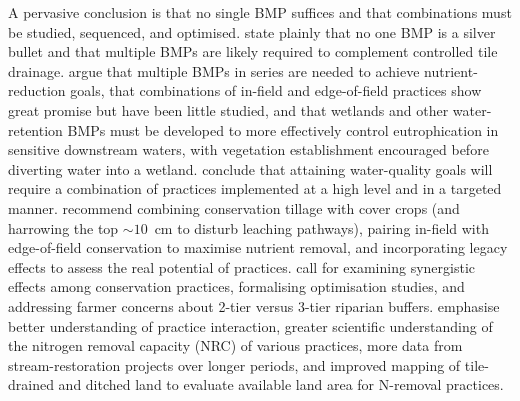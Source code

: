 \documentclass[11pt]{article}
\begin{document}
A pervasive conclusion is that no single BMP suffices and that combinations must be studied, sequenced, and optimised. \textcite{Sunohara2016} state plainly that no one BMP is a silver bullet and that multiple BMPs are likely required to complement controlled tile drainage. \textcite{Lenhart2016} argue that multiple BMPs in series are needed to achieve nutrient-reduction goals, that combinations of in-field and edge-of-field practices show great promise but have been little studied, and that wetlands and other water-retention BMPs must be developed to more effectively control eutrophication in sensitive downstream waters, with vegetation establishment encouraged before diverting water into a wetland. \textcite{Christianson2014} conclude that attaining water-quality goals will require a combination of practices implemented at a high level and in a targeted manner. \textcite{Makhtoumi2025} recommend combining conservation tillage with cover crops (and harrowing the top ${\sim}10$~cm to disturb leaching pathways), pairing in-field with edge-of-field conservation to maximise nutrient removal, and incorporating legacy effects to assess the real potential of practices. \textcite{Kreig2019} call for examining synergistic effects among conservation practices, formalising optimisation studies, and addressing farmer concerns about 2-tier versus 3-tier riparian buffers. \textcite{McLellan2015} emphasise better understanding of practice interaction, greater scientific understanding of the nitrogen removal capacity (NRC) of various practices, more data from stream-restoration projects over longer periods, and improved mapping of tile-drained and ditched land to evaluate available land area for N-removal practices.
\end{document}
